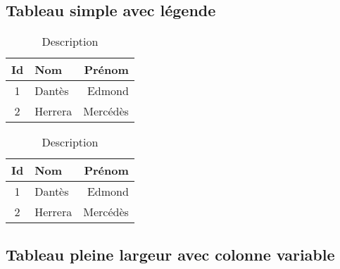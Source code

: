 \documentclass{article}
\begin{document}
\begin{multicols*}{3}
\subsection*{Tableau simple avec légende}
\begin{minipage}[c]{0.7\linewidth}
    \begin{latexcode}
        \begin{table}[H] \centering
            \caption{Description \label{tb:tab1}}
            \begin{tabular}{c|lr} \toprule
                Id & Nom     & Prénom   \\ \midrule
                1  & Dantès  & Edmond   \\
                2  & Herrera & Mercédès \\ \bottomrule
            \end{tabular} \end{table}
    \end{latexcode}
\end{minipage}
\begin{minipage}[c]{0.3\linewidth}
    \begin{table}[H]
        \centering
        \caption{Description}
        \begin{tabular}{c|lr}
            \toprule
            Id & Nom     & Prénom   \\
            \midrule
            1  & Dantès  & Edmond   \\
            2  & Herrera & Mercédès \\
            \bottomrule
        \end{tabular}
    \end{table}
\end{minipage}

\subsection*{Tableau pleine largeur avec colonne variable}


\end{multicols*}
\end{document}
